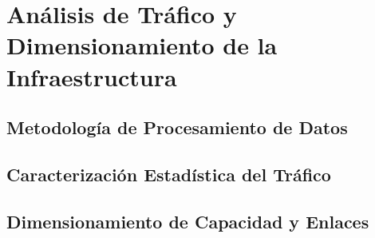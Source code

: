 \section{Análisis de Tráfico y Dimensionamiento de la Infraestructura}
\label{sec:analisis_trafico}

\subsection{Metodología de Procesamiento de Datos}
\label{subsec:metodologia_trafico}

\subsection{Caracterización Estadística del Tráfico}
\label{subsec:estadistica_trafico}

\subsection{Dimensionamiento de Capacidad y Enlaces}
\label{subsec:dimensionamiento_capacidad}
